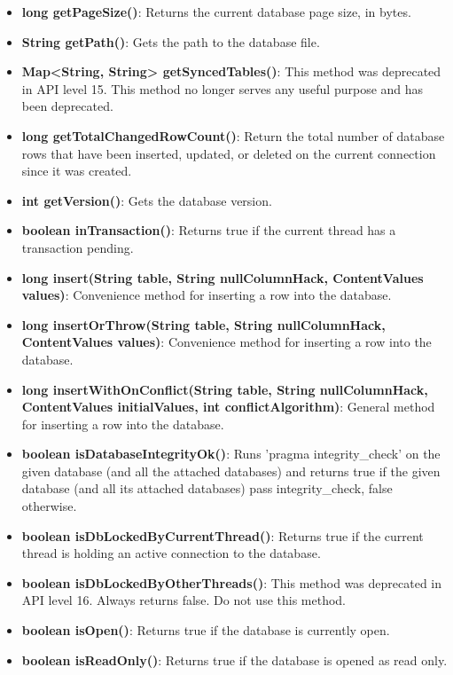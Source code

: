 \documentclass{report}
\begin{document}
\begin{itemize}
\begin{itemize}
\begin{itemize}
                \item \textbf{long	getPageSize()}: Returns the current database page size, in bytes.
                \item \textbf{String	getPath()}: Gets the path to the database file.
                \item \textbf{Map<String, String>	getSyncedTables()}: This method was deprecated in API level 15. This method no longer serves any useful purpose and has been deprecated.
                \item \textbf{long	getTotalChangedRowCount()}: Return the total number of database rows that have been inserted, updated, or deleted on the current connection since it was created.
                \item \textbf{int	getVersion()}: Gets the database version.
                \item \textbf{boolean	inTransaction()}: Returns true if the current thread has a transaction pending.
                \item \textbf{long	insert(String table, String nullColumnHack, ContentValues values)}: Convenience method for inserting a row into the database.
                \item \textbf{long	insertOrThrow(String table, String nullColumnHack, ContentValues values)}: Convenience method for inserting a row into the database.
                \item \textbf{long	insertWithOnConflict(String table, String nullColumnHack, ContentValues initialValues, int conflictAlgorithm)}: General method for inserting a row into the database.
                \item \textbf{boolean	isDatabaseIntegrityOk()}: Runs 'pragma integrity\_check' on the given database (and all the attached databases) and returns true if the given database (and all its attached databases) pass integrity\_check, false otherwise.
                \item \textbf{boolean	isDbLockedByCurrentThread()}: Returns true if the current thread is holding an active connection to the database.
                \item \textbf{boolean	isDbLockedByOtherThreads()}: This method was deprecated in API level 16. Always returns false. Do not use this method.
                \item \textbf{boolean	isOpen()}: Returns true if the database is currently open.
                \item \textbf{boolean	isReadOnly()}: Returns true if the database is opened as read only.

\end{itemize}
\end{itemize}
\end{itemize}
\end{document}
